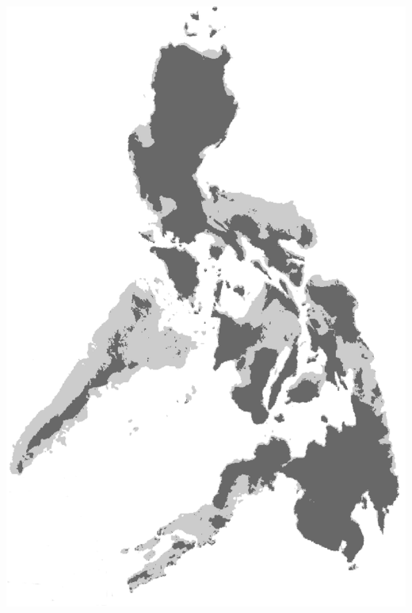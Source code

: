 \begin{frame}
\begin{columns}[c]
            \includegraphics[width=\textwidth]{images/maps/Philippines.png}
    \end{columns}
\end{frame}

